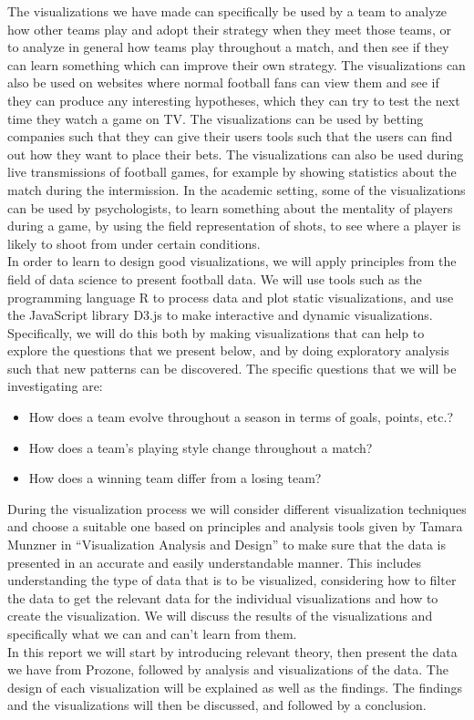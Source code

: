 \documentclass[Report.tex]{subfiles}
\begin{document}
The visualizations we have made can specifically be used by a team to analyze how other teams play and adopt their strategy when they meet those teams, or to analyze in general how teams play throughout a match, and then see if they can learn something which can improve their own strategy. The visualizations can also be used on websites where normal football fans can view them and see if they can produce any interesting hypotheses, which they can try to test the next time they watch a game on TV. The visualizations can be used by betting companies such that they can give their users tools such that the users can find out how they want to place their bets. The visualizations can also be used during live transmissions of football games, for example by showing statistics about the match during the intermission. In the academic setting, some of the visualizations can be used by psychologists, to learn something about the mentality of players during a game, by using the field representation of shots, to see where a player is likely to shoot from under certain conditions.
\\

In order to learn to design good visualizations, we will apply principles from the field of data science to present football data. We will use tools such as the programming language R to process data and plot static visualizations, and use the JavaScript library D3.js to make interactive and dynamic visualizations. 
Specifically, we will do this both by making visualizations that can help to explore the questions that we present below, and by doing exploratory analysis such that new patterns can be discovered. The specific questions that we will be investigating are: 
\begin{itemize}
\item How does a team evolve throughout a season in terms of goals, points,
etc.?
\item How does a team’s playing style change throughout a match?
\item How does a winning team differ from a losing team?
\end{itemize}
During the visualization process we will consider different visualization techniques and choose a suitable one based on principles and analysis tools given by Tamara Munzner in “Visualization Analysis and Design” to make sure that the data is presented in an accurate and easily understandable manner. This includes understanding the type of data that is to be visualized, considering how to filter the data to get the relevant data for the individual visualizations and how to create the visualization. We will discuss the results of the visualizations and specifically what we can and can’t learn from them.
\\

In this report we will start by introducing relevant theory, then present the data we have from Prozone, followed by analysis and visualizations of the data. The design of each visualization will be explained as well as the findings. The findings and the visualizations will then be discussed, and followed by a conclusion.
\end{document}
